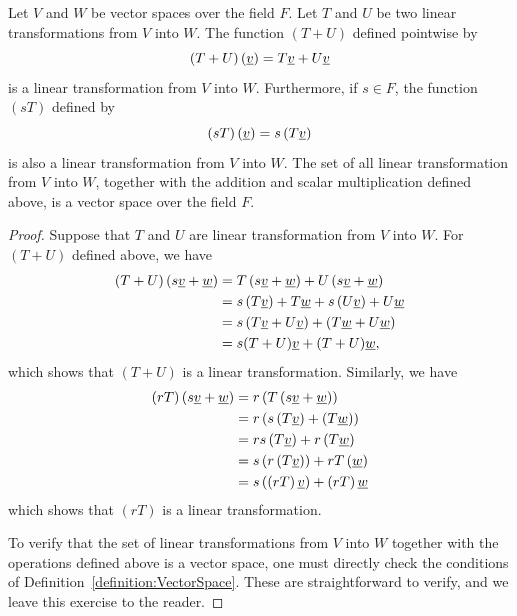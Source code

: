 \begin{theorem}
Let $V$ and $W$ be vector spaces over the field $F$.
Let $T$ and $U$ be two linear transformations from $V$ into $W$.
The function $(T+U)$ defined pointwise by
\begin{equation*}
(T + U) \left( \underline{v} \right) = T \underline{v} + U \underline{v}
\end{equation*}
is a linear transformation from $V$ into $W$.
Furthermore, if $s \in F$, the function $(sT)$ defined by
\begin{equation*}
(sT) \left( \underline{v} \right) = s \left( T \underline{v} \right)
\end{equation*}
is also a linear transformation from $V$ into $W$.
The set of all linear transformation from $V$ into $W$, together with the addition and scalar multiplication defined above, is a vector space over the field $F$.
\end{theorem}
\begin{proof}
Suppose that $T$ and $U$ are linear transformation from $V$ into $W$.
For $(T + U)$ defined above, we have
\begin{equation*}
\begin{split}
(T+U) \left( s \underline{v} + \underline{w} \right)
&= T \left( s \underline{v} + \underline{w} \right)
+ U \left( s \underline{v} + \underline{w} \right) \\
&= s \left( T \underline{v} \right) + T \underline{w}
+ s \left( U \underline{v} \right) + U \underline{w} \\
&= s \left( T \underline{v} + U \underline{v} \right)
+ \left( T \underline{w} + U \underline{w} \right) \\
&= s ( T + U ) \underline{v} + ( T + U ) \underline{w} ,
\end{split}
\end{equation*}
which shows that $(T+U)$ is a linear transformation.
Similarly, we have
\begin{equation*}
\begin{split}
(r T) \left( s \underline{v} + \underline{w} \right)
&= r \left( T \left( s \underline{v} + \underline{w} \right) \right) \\
&= r \left( s \left( T \underline{v} \right) + \left( T \underline{w} \right) \right) \\
&= r s \left( T \underline{v} \right) + r \left( T \underline{w} \right) \\
&= s \left( r \left( T \underline{v} \right) \right) + r T \left( \underline{w} \right) \\
&= s \left( \left( r T \right) \underline{v} \right) + \left( r T \right) \underline{w}
\end{split}
\end{equation*}
which shows that $(rT)$ is a linear transformation.

To verify that the set of linear transformations from $V$ into $W$ together with the operations defined above is a vector space, one must directly check the conditions of Definition~\ref{definition:VectorSpace}.
These are straightforward to verify, and we leave this exercise to the reader.
\end{proof}


